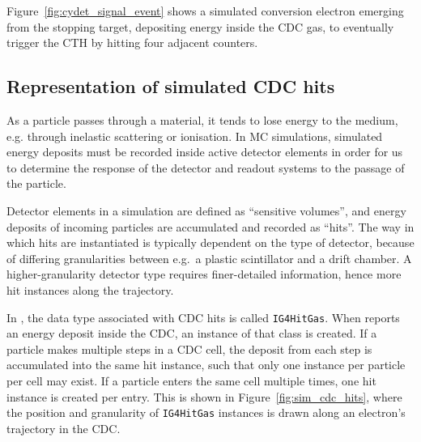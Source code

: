 Figure~\ref{fig:cydet_signal_event} shows a simulated conversion electron
emerging from the stopping target, depositing energy inside the CDC gas, to
eventually trigger the CTH by hitting four adjacent counters. 

\subsection{Representation of simulated CDC hits}
\label{subsec:SD}
As a particle passes through a material, it tends to lose energy to the medium, e.g. through inelastic scattering or ionisation. 
In MC simulations, simulated energy deposits must be recorded inside active detector elements in order for us to determine the response of the detector and readout systems to the passage of the particle.

Detector elements in a \Geant simulation are defined as ``sensitive volumes'', and energy deposits of incoming particles are accumulated and recorded as ``hits''. 
The way in which hits are instantiated is typically dependent on the type of detector, because of differing granularities between e.g.\ a plastic scintillator and a drift chamber. A higher-granularity detector type requires finer-detailed information, hence more hit instances along the trajectory.

In \SimG, the data type associated with CDC hits is called \texttt{IG4HitGas}. When \Geant reports an energy deposit inside the CDC, an instance of that class is created. If a particle makes multiple steps in a CDC cell, the deposit from each step is accumulated into the same hit instance, such that only one instance per particle per cell may exist. If a particle enters the same cell multiple times, one hit instance is created per entry.
This is shown in Figure~\ref{fig:sim_cdc_hits}, where the position and granularity of \texttt{IG4HitGas} instances is drawn along an electron's trajectory in the CDC.




